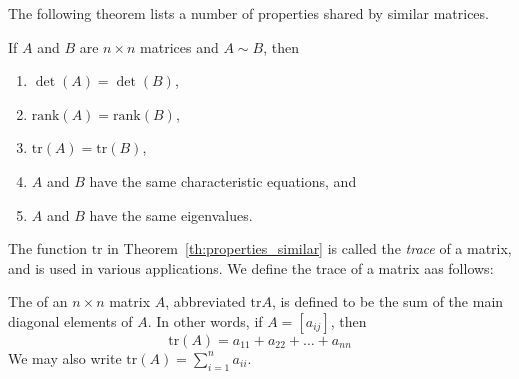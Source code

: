 \documentclass{ximera}
\begin{document}
The following theorem lists a number of properties shared by similar matrices.
 
\begin{theorem}\label{th:properties_similar}
If $A$ and $B$ are $n\times n$ matrices and $A\sim B$, then
\begin{enumerate}
\item\label{th:properties_similar_det} $\det(A) = \det(B)$,
\item\label{th:properties_similar_rank} $\mbox{rank}(A) = \mbox{rank}(B)$,
\item\label{th:properties_similar_trace} $\mbox{tr}(A)= \mbox{tr}(B)$,
\item\label{th:properties_similar_char_poly} $A$ and $B$ have the same characteristic equations, and
\item\label{th:properties_similar_eig} $A$ and $B$ have the same eigenvalues.
\end{enumerate}
\end{theorem}

The function $\mbox{tr}$ in Theorem~\ref{th:properties_similar} is called the \emph{trace} of a matrix, and is used in various applications.  We define the trace of a matrix aas follows:

\begin{definition}\label{def:trace}
    The  of an $n \times n$ matrix $A$, abbreviated $\mbox{tr} A$, is defined to be the sum of the main diagonal elements of $A$.  In other words, if $ A = [a_{ij}]$, then $$\mbox{tr}(A) = a_{11} + a_{22} + \dots + a_{nn}$$  We may also write $\mbox{tr}(A) =\sum_{i=1}^n a_{ii}$.
\end{definition}
 
 
 
 
\end{document}
